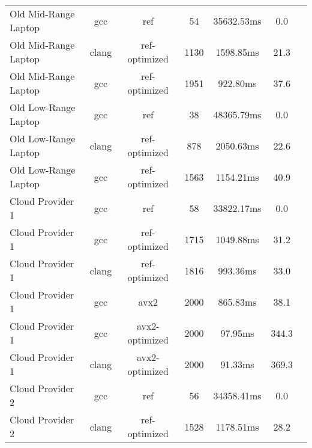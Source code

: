 \begin{table}
\begin{tabularx}{\linewidth}{X c c c c c c}
        Old Mid-Range Laptop &                  gcc &                  ref &                   54 &           35632.53ms &                  0.0\\
        Old Mid-Range Laptop &                clang &        ref-optimized &                 1130 &            1598.85ms &                 21.3\\
        Old Mid-Range Laptop &                  gcc &        ref-optimized &                 1951 &             922.80ms &                 37.6\\
        Old Low-Range Laptop &                  gcc &                  ref &                   38 &           48365.79ms &                  0.0\\
        Old Low-Range Laptop &                clang &        ref-optimized &                  878 &            2050.63ms &                 22.6\\
        Old Low-Range Laptop &                  gcc &        ref-optimized &                 1563 &            1154.21ms &                 40.9\\
            Cloud Provider 1 &                  gcc &                  ref &                   58 &           33822.17ms &                  0.0\\
            Cloud Provider 1 &                  gcc &        ref-optimized &                 1715 &            1049.88ms &                 31.2\\
            Cloud Provider 1 &                clang &        ref-optimized &                 1816 &             993.36ms &                 33.0\\
            Cloud Provider 1 &                  gcc &                 avx2 &                 2000 &             865.83ms &                 38.1\\
            Cloud Provider 1 &                  gcc &       avx2-optimized &                 2000 &              97.95ms &                344.3\\
            Cloud Provider 1 &                clang &       avx2-optimized &                 2000 &              91.33ms &                369.3\\
            Cloud Provider 2 &                  gcc &                  ref &                   56 &           34358.41ms &                  0.0\\
            Cloud Provider 2 &                clang &        ref-optimized &                 1528 &            1178.51ms &                 28.2\\

\end{tabularx}
\end{table}
